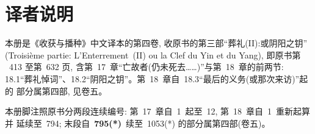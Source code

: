 \documentclass[
    PaperSize=a4paper,
    HeadingFont=hei,
    Biblatex=false,
    BookTitleCN={收获与播种},
    Translator={数译},
    LogoFile=logo.pdf
]{mathtranslation}
\begin{document}
\frontmatter
\makecover

\chapter*{译者说明}

本册是《收获与播种》中文译本的第四卷, 收原书的第三部“葬礼(II):或阴阳之钥”
(Troisième partie: L'Enterrement~(II) ou la Clef du Yin et du Yang), 即原书第
~413 至第~632 页, 含第~17~章“亡故者(仍未死去……)”与第~18~章的前两节:
18.1“葬礼悼词”、18.2“阴阳之钥”。第~18~章自~18.3“最后的义务(或那次来访)”起的
部分属第四部, 见卷五。

本册脚注照原书分两段连续编号: 第~17~章自~1~起至~12, 第~18~章自~1~重新起算并
延续至~794; 末段自~\textbf{795(*)}~续至~1053(*) 的部分属第四部(卷五)。

\CommonNoteBody

\makecontents

\mainmatter


\setcounter{chapter}{16}



\end{document}

